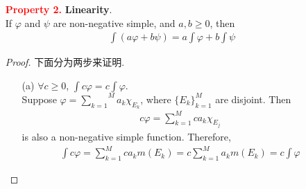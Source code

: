 \begin{enumerate}
		\newpage	
		下面来证明原命题.
		\begin{proof}
			 According to Lemma \ref{lemma 3.1.1}, there exists another decompositon of $\overset{N}{\underset{k = 1}{\bigcup}}{E_k}$, i.e.
			 \begin{align}
			 	\bigcup_{j = 1}^{M}{\widetilde{E}_j} = \bigcup_{k = 1}^{N}{E_k}
			 \end{align}
		 	where $\{ \widetilde{E}_j \}_{j = 1}^M$ are disjoint, and for each $1 \leq k \leq M$,
		 	\begin{align}
		 		E_k = \bigcup_{\widetilde{E}_j \subset E_k}{\widetilde{E}_j}
		 	\end{align}
	 		Let
	 		\begin{align}
	 			\widetilde{a}_j \coloneqq \sum_{\widetilde{E}_j \subset E_k}{a_k}
	 		\end{align}
 			Then clearly
 			\begin{align}
 				\varphi = \sum_{j = 1}^{M}{\widetilde{a}_j \chi_{\widetilde{E}_j}}
 			\end{align}
 			Since $\{ \widetilde{E}_j \}_{j = 1}^M$ are disjoint, we get
 			\begin{align}
 				\int{\varphi} = \sum_{j = 1}^{M}{\widetilde{a}_j m(\widetilde{E}_j)} = \sum_{j = 1}^{M}{\sum_{\widetilde{E}_j \subset E_k}{a_k m(\widetilde{E}_j)}} = \sum_{k = 1}^{N}{a_k m(E_k)}
 			\end{align}
		\end{proof}
		
		\vspace{2em}
		\item[\textcolor{red}{\textbf{Property 2.}}]\textbf{Linearity}.\\
		If $\varphi$ and $\psi$ are non-negative simple, and $a , b \geq 0$, then
		\begin{align}
			\int{(a \varphi + b \psi)} = a\int{\varphi} + b\int{\psi}
		\end{align}
		
		\vspace{2em}
		\begin{proof}
			下面分为两步来证明.
			\begin{enumerate}
				\item[(a)]$\forall c \geq 0$, $\int{c \varphi} = c \int{\varphi}$.\\
				Suppose $\varphi = \overset{M}{\underset{k = 1}{\sum}}{a_k \chi_{E_k}}$, where $\{ E_k \}_{k = 1}^{M}$ are disjoint. Then
				\begin{align}
					c\varphi = \sum_{k = 1}^{M}{c a_k \chi_{E_j}}
				\end{align}
				is also a non-negative simple function. Therefore,
				\begin{align}
					\int{c\varphi} = \sum_{k = 1}^{M}{c a_k m(E_k)} = c\sum_{k = 1}^{M}{a_k m(E_k)} = c\int{\varphi}
				\end{align}
			

\end{enumerate}
\end{proof}
\end{enumerate}
